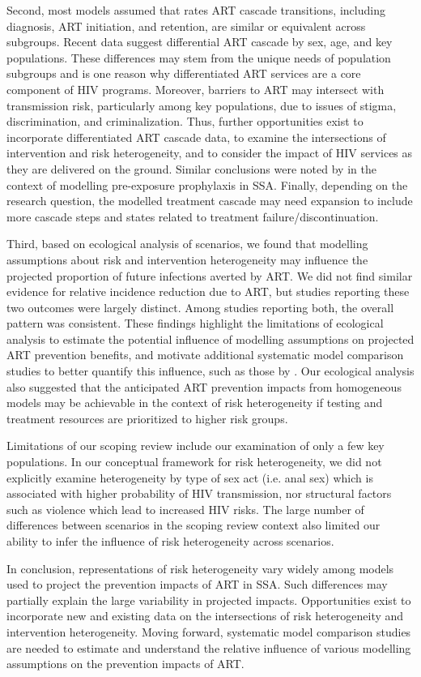Second, most models assumed that rates ART cascade transitions,
including diagnosis, ART initiation, and retention,
are similar or equivalent across subgroups.
Recent data suggest differential ART cascade by sex, age, and key populations.
These differences may stem from the unique needs of population subgroups
and is one reason why differentiated ART services are a core component of HIV programs.
Moreover, barriers to ART may intersect with transmission risk, particularly among key populations,
due to issues of stigma, discrimination, and criminalization.
Thus, further opportunities exist to incorporate differentiated ART cascade data,
to examine the intersections of intervention and risk heterogeneity, and
to consider the impact of HIV services as they are delivered on the ground.
Similar conclusions were noted by \citet{Case2019}
in the context of modelling pre-exposure prophylaxis in SSA.
Finally, depending on the research question, the modelled treatment cascade may need expansion
to include more cascade steps and states related to treatment failure/discontinuation.

Third, based on ecological analysis of scenarios, we found that
modelling assumptions about risk and intervention heterogeneity
may influence the projected proportion of future infections averted by ART.
We did not find similar evidence for relative incidence reduction due to ART,
but studies reporting these two outcomes were largely distinct.
Among studies reporting both, the overall pattern was consistent.
These findings highlight the limitations of ecological analysis to estimate
the potential influence of modelling assumptions on projected ART prevention benefits,
and motivate additional systematic model comparison studies to better quantify this influence,
such as those by \citet{Dodd2010,Hontelez2013}.
Our ecological analysis also suggested that the anticipated ART prevention impacts from homogeneous models
may be achievable in the context of risk heterogeneity
if testing and treatment resources are prioritized to higher risk groups.

Limitations of our scoping review include our examination of only a few key populations.
In our conceptual framework for risk heterogeneity, we did not explicitly examine heterogeneity
by type of sex act (i.e. anal sex) which is associated with higher probability of HIV transmission,
nor structural factors such as violence which lead to increased HIV risks.
The large number of differences between scenarios in the scoping review context
also limited our ability to infer the influence of risk heterogeneity across scenarios.

In conclusion, representations of risk heterogeneity vary widely
among models used to project the prevention impacts of ART in SSA.
Such differences may partially explain the large variability in projected impacts.
Opportunities exist to incorporate new and existing data on
the intersections of risk heterogeneity and intervention heterogeneity.
Moving forward, systematic model comparison studies are needed to
estimate and understand the relative influence of various modelling assumptions on the prevention impacts of ART.
